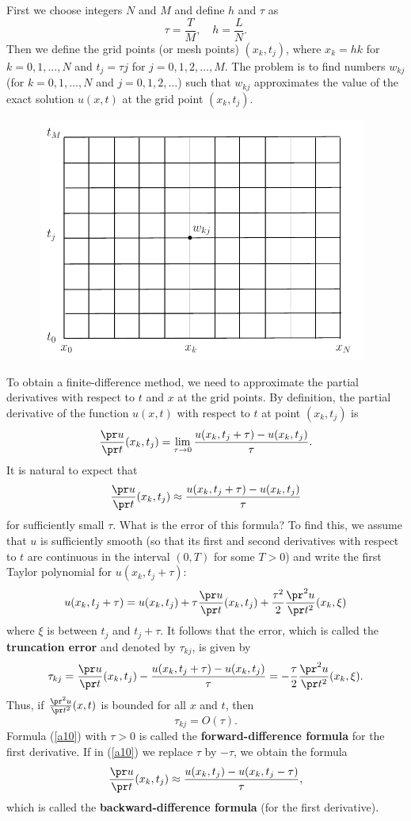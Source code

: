 First we choose integers $N$ and $M$ and define
$h$ and $\tau$ as
\[
\tau=\frac{T}{M}, \quad h=\frac{L}{N}.
\]
Then we define the grid points (or mesh points)
$(x_{k}, t_{j})$, where $x_{k}=hk$ for $k=0,1,\dots,N$ and
$t_{j}=\tau j$ for $j=0,1,2,\dots,M$. The problem is to find numbers $w_{kj}$
(for $k=0,1,\dots,N$ and $j=0,1,2,\dots$) such that $w_{kj}$ approximates the value of the exact solution
$u(x,t)$ at the grid point $(x_{k}, t_{j})$.
\begin{figure}[h]
\centering
\includegraphics[width=11cm,height=8cm]{basic_grid2.pdf}
\caption{}
\end{figure}
 
To obtain a finite-difference method, we need to approximate the partial derivatives
with respect to $t$ and $x$ at the grid points. By definition,
the partial derivative of the function $u(x,t)$ with respect to
$t$ at point $(x_k,t_j)$ is
\[
\frac{\pr u}{\pr t}(x_k,t_j)=\lim_{\tau\to 0}\frac{u(x_k,t_j+\tau)-u(x_k,t_j)}{\tau}.
\]
It is natural to expect that
\begin{equation}
\frac{\pr u}{\pr t}(x_k,t_j)\approx \frac{u(x_k,t_j+\tau)-u(x_k,t_j)}{\tau}
\label{a10}
\end{equation}
for sufficiently small $\tau$. What is the error of this formula?
To find this, we assume that $u$ is sufficiently smooth (so that its first and second
derivatives with respect to $t$ are continuous in the interval $(0,T)$ for some $T>0$)
and write the first Taylor polynomial for $u(x_k,t_j+\tau)$:
\[
u(x_k,t_j+\tau)=u(x_k,t_j)+\tau \frac{\pr u}{\pr t}(x_k,t_j)+
\frac{\tau^2}{2}\frac{\pr^2 u}{\pr t^2}(x_k,\xi)
\]
where $\xi$ is between $t_j$ and $t_j+\tau$. It follows that the error,
which is called the {\bf truncation error } and denoted by $\tau_{kj}$,
is given by
\[
\tau_{kj}=\frac{\pr u}{\pr t}(x_k,t_j)-\frac{u(x_k,t_j+\tau)-u(x_k,t_j)}{\tau}=
-\frac{\tau}{2}\frac{\pr^2 u}{\pr t^2}(x_k,\xi).
\]
Thus, if $\frac{\pr^2 u}{\pr t^2}(x,t)$ is bounded for all $x$ and $t$, then
\[
\tau_{kj}=O(\tau).
\]
Formula (\ref{a10}) with $\tau>0$ is called the {\bf forward-difference formula}
for the first derivative.
If in (\ref{a10}) we replace $\tau$ by $-\tau$, we obtain the formula
\begin{equation}
\frac{\pr u}{\pr t}(x_k,t_j)\approx \frac{u(x_k,t_j)-u(x_k,t_j-\tau)}{\tau},
\label{a11}
\end{equation}
which is called the {\bf backward-difference formula} (for the first derivative).
 
